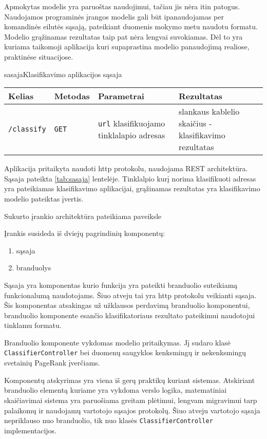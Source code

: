 
Apmokytas modelis yra paruoštas naudojimui, tačiau jis nėra itin patogus. Naudojamos programinės įrangos modelis gali būt ipanaudojamas per komandinės eilutės sąsają, pateikiant duomenis mokymo metu naudotu formatu. Modelio grąžinamas rezultatas taip pat nėra lengvai suvokiamas. Dėl to yra kuriama taikomoji aplikacija kuri supaprastina modelio panaudojimą realiose, praktinėse situacijose.

\begin{ktutable}{sasaja}{Klasifikavimo aplikacijos sąsaja}
    \begin{tabular}{|l|l|p{5cm}|p{5cm}|}
    \hline
        Kelias & Metodas & Parametrai & Rezultatas \\ \hline
        \texttt{/classify} & \texttt{GET} & \texttt{url} klasifikuojamo tinklalapio adresas & slankaus kablelio skaičius - klasifikavimo rezultatas \\ \hline
    \end{tabular}
\end{ktutable}

Aplikacija pritaikyta naudoti http protokolu, naudojama REST architektūra. Sąsaja pateikta \vref{tab:sasaja} lentelėje. Tinklalpio kurį norima klasifikuoti adresas yra pateikiamas klasifikavimo aplikacijai, grąžinamas rezultatas yra klasifikavimo modelio pateiktas įvertis.

Sukurto įrankio architektūra pateikiama paveiksle 


Įrankis susideda iš dviejų pagrindinių komponentų:
\begin{enumerate}
\item sąsaja
\item branduolys
\end{enumerate}
Sąsaja yra komponentas kurio funkcija yra pateikti branduolio suteikiamą funkcionalumą naudotojams. Šiuo atveju tai yra http protokolu veikianti sąsaja. Šis komponentas atsakingas už užklausos perdavimą branduolio komponentui, branduolio komponente esančio klasifikatoriaus rezultato pateikimui naudotojui tinklamu formatu.

Branduolio komponente vykdomas modelio pritaikymas. Jį sudaro klasė \texttt{ClassifierController} bei duomenų saugyklos kenksmingų ir nekenksmingų svetainių PageRank įverčiams.

Komponentų atskyrimas yra viena iš gerų praktikų kuriant sistemas. Atskiriant branduolio elementą kuriame yra vykdoma verslo logika, matematiniai skaičiavimai sistema yra paruošiama greitam plėtimui, lengvam migravimui tarp palaikomų ir naudojamų vartotojo sąsajos protokolų. Šiuo atveju vartotojo sąsaja nepriklauso nuo branduolio, tik nuo klasės \texttt{ClassifierController} implementacijos.

